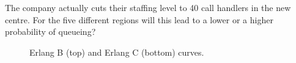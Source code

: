 \documentclass[12pt,fleqn]{article}
\begin{document}
\begin{exam}
\begin{question}
\begin{qupart}
The company actually cuts their staffing level to 40 call handlers in the new centre. For the five different regions will this lead to a lower or a higher probability of queueing?
\end{qupart}

\end{question}


\continued
\begin{question}

  
\begin{qupart}
\end{qupart}
%
\begin{qupart}
\end{qupart}


\begin{qupart}
\end{qupart}
\end{question}
\continued


\begin{question}
\begin{qupart}
\end{qupart}

\begin{qupart}
\end{qupart}

\begin{qupart}
\end{qupart}

\begin{qupart}
\end{qupart}

 
\end{question}

\continued
\topmargin -1.8cm
%
\newcommand{\figureTextSize}{\tiny}
\begin{figure}[h]
\small
\centerline{}
\centerline{}
\caption{Erlang B (top) and Erlang C (bottom) curves.}
\end{figure}

\questionsend
\end{exam}
\end{document}
